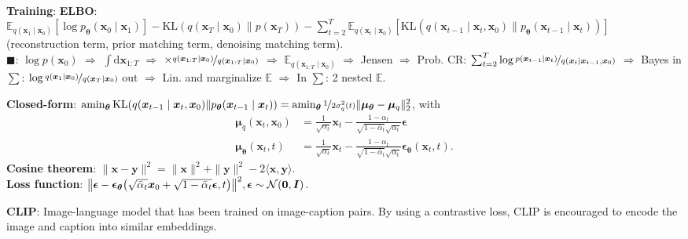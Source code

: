 \documentclass{article}
\DeclareMathOperator*{\argmin}{amin}
\newcommand{\lft}{\mathopen{}\mathclose\bgroup\left}
\newcommand{\rgt}{\aftergroup\egroup\right}
\newcommand{\E}{\mathbb{E}}
\renewcommand{\vec}[1]{\bm{#1}}
\newcommand{\mat}[1]{\bm{#1}}
\newenvironment{topic}[1]
{\textbf{\sffamily \colorbox{black}{\rlap{\textbf{\textcolor{white}{#1}}}\hspace{\linewidth}\hspace{-2\fboxsep}}} \\ \vspace{0.2cm}}
{}
\begin{document}
\begin{multicols*}{2}
\begin{topic}{Diffusion models}
        \textbf{Training}: \textbf{ELBO}: $\E_{q(\vec{x}_1\mid \vec{x}_0)}[\log p_{\vec{\theta}}(\vec{x}_0 \mid \vec{x}_1)] - \mathrm{KL}(q(\vec{x}_T \mid \vec{x}_0) \| p(\vec{x}_T)) - \sum_{t=2}^{T} \E_{q(\vec{x}_t \mid \vec{x}_0)} [\mathrm{KL}(q(\vec{x}_{t-1} \mid \vec{x}_t, \vec{x}_0) \| p_{\vec{\theta}}(\vec{x}_{t-1} \mid \vec{x}_t))]$ (reconstruction term, prior matching term, denoising matching term). \\
        $\blacksquare$: $\log p(\vec{x}_0)$ $\Rightarrow$ $ \int \mathrm{d}\vec{x}_{1:T}$ $\Rightarrow$ $\times \nicefrac{q(\vec{x}_{1:T} \mid \vec{x}_0)}{q(\vec{x}_{1:T} \mid \vec{x}_0)}$ $\Rightarrow$ $\E_{q(\vec{x}_{1:T} \mid \vec{x}_0)}$ $\Rightarrow$ Jensen $\Rightarrow$ Prob. CR: $\sum_{t=2}^{T} \log \nicefrac{p(\vec{x}_{t-1} \mid \vec{x}_t)}{q(\vec{x}_t \mid \vec{x}_{t-1}, \vec{x}_0)}$ $\Rightarrow$ Bayes in $\sum$: $\log \nicefrac{q(\vec{x}_1 \mid \vec{x}_0)}{q(\vec{x}_T \mid \vec{x}_0)}$ out $\Rightarrow$ Lin. and marginalize $\E$ $\Rightarrow$ In $\sum$: 2 nested $\E$.

        \textbf{Closed-form}: $\argmin\nolimits_{\vec{\theta}} \mathrm{KL}(q(\vec{x}_{t-1} \mid \vec{x}_t, \vec{x}_0) \| p_{\vec{\theta}}(\vec{x}_{t-1} \mid \vec{x}_t)) = \argmin\nolimits_{\vec{\theta}} \nicefrac{1}{2 \sigma_q^2(t)} \| \vec{\mu}_{\vec{\theta}} - \vec{\mu}_q \|_2^2$,
        with
        \begin{align*}
            \vec{\mu}_q(\vec{x}_t, \vec{x}_0)      & = \frac{1}{\sqrt{\alpha_t}} \vec{x}_t - \frac{1-\alpha_t}{\sqrt{1-\bar{\alpha}_t} \sqrt{\alpha_t}} \vec{\epsilon}                                 \\
            \vec{\mu}_{\vec{\theta}}(\vec{x}_t, t) & = \frac{1}{\sqrt{\alpha_t}} \vec{x}_t - \frac{1 - \alpha_t}{\sqrt{1-\bar{\alpha}_t} \sqrt{\alpha_t}} \vec{\epsilon}_{\vec{\theta}}(\vec{x}_t, t).
        \end{align*}
        \textbf{Cosine theorem}: $\| \vec{x} - \vec{y} \|^2 = \| \vec{x} \|^2 + \| \vec{y} \|^2 -2 \langle \vec{x}, \vec{y} \rangle$. \\
        \textbf{Loss function}: $\lft\| \vec{\epsilon} - \vec{\epsilon}_{\vec{\theta}}\lft(
            \sqrt{\bar{\alpha}_t} \vec{x}_0 + \sqrt{1 - \bar{\alpha}_t} \vec{\epsilon}, t \rgt) \rgt\|^2,
            \vec{\epsilon} \sim \mathcal{N}(\vec{0}, \mat{I})$.

        \textbf{CLIP}: Image-language model that has been trained on image-caption pairs. By using a
        contrastive loss, CLIP is encouraged to encode the image and caption into similar embeddings.


\end{topic}
\end{multicols*}
\end{document}
